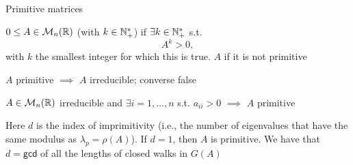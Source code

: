 \documentclass[aspectratio=43]{beamer}
\begin{document}
\begin{frame}{Primitive matrices}
\begin{definition}
$0\leq A\in\mathcal{M}_n(\mathbb{R})$  (with  $k\in \mathbb{N}_{+}^{*}$) if $\exists k\in \mathbb{N}_{+}^{*}$ s.t.
\[
A^k>0,
\]
with $k$ the smallest integer for which this is true.
$A$  if it is not primitive
\end{definition}
\vfill
$A$ primitive $\implies$ $A$ irreducible; converse false
\vfill
\begin{theorem}
	$A\in\mathcal{M}_n(\mathbb{R})$ irreducible and $\exists i=1,\ldots,n$ s.t. $a_{ii}>0$ $\implies$ $A$ primitive
\end{theorem}
\vfill
Here $d$ is the index of imprimitivity (i.e., the number of eigenvalues that have the same modulus as $\lambda_p=\rho(A)$). If $d=1$, then $A$ is primitive. We have that $d=\mathsf{gcd}$ of all the lengths of closed walks in $G(A)$
\end{frame}
\end{document}
